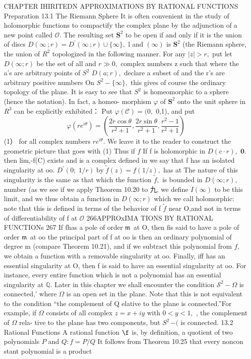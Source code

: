 CHAPTER IHIRITEDN APPROXIMATIONS BY RATIONAL FUNCTIONS Preparation 13.1 The Riemann Sphere It is often convenient in the study of holomorphic functions to compactify the complex plane by the adjunction of a new point called ${\mathcal{O}}.$ The resulting set ${\boldsymbol{S}}^{2}$ to be open if and only if it is the union of discs $D(\infty\,;r)=D^{\prime}(\infty\,;r)\cup\{\infty\},$ l and $\scriptstyle(\infty)$ is ${\boldsymbol{S}}^{2}$ (the Riemann sphere, the union of $R^{2}$ topologized in the following manner. For any $|z|>r,$ put let $D(\infty;r)$ be the set of all and $\scriptstyle r\gg0,$ complex numbers z such that where the a's are arbitrary points of $S^{2}$ $D(a;r),$ declare a subset of and the r's are arbitrary positive numbers On $S^{2}-\{\infty\},$ this gives of course the ordinary topology of the plane. It is easy to see that $S^{2}$ is homeomorphic to a sphere (hence the notation). In fact, a homeo- morphism $\varphi$ of ${\boldsymbol{S}}^{2}$ onto the unit sphere in $R^{3}$ can be explicitly exhibited： Put $\varphi(\mathcal{C})=(0,$ 0,1), and put $$ \varphi(r e^{i\theta})=\left(\frac{2r\;\mathrm{cos}\;\theta}{r^{2}+1},\frac{2r\;\mathrm{sin}\;\theta}{r^{2}+1},\frac{r^{2}-1}{r^{2}+1}\right) $$ (1） for all complex numbers $r e^{i\theta}.$ We leave it to the reader to construct the geometric picture that goes with (1) Thus if $\boldsymbol{\mathit{f}}$ If f is holomorphic in $D(c\cdot r),$ ${\boldsymbol{0}}.$ then lim,-f(C) exists and is a complex defined in we say that f has an isolated singularity at oo. $D^{\prime}(0;\;1/r)\;\mathrm{by}\;{\tilde{f}}(z)=f(1/z),$ has at The nature of this singularity is the same as that which the function ${\tilde{f}},$ is bounded in $D(\infty;r),$ number (as we see if we apply Theorem 10.20 to 九, we define $\scriptstyle I(\infty)$ to be this limit, and we thus obtain a function in $D(\infty;r)$ which we call holomorphic: note that this is defined in terms of the behavior of f $\tilde{f}$ near O,and not in terms of differentiability of f at ${\mathcal{O}}$ 266APPROxIMA TIONS BY RATIONAL FUNCTIONs 267 If fhas a pole of order ${\mathfrak{m}}\,$ at O, then fis said to have a pole of order ${\mathfrak{m}}\,$ at oo the principal part of f at oo is then an ordinary polynomial of degree m (compare Theorem 10.21), and if we subtract this polynomial from $f,$ we obtain a function with a removable singularity at oo. Finally, iff has an essential singularity at O, then f is said to have an essential singularity at oo. For instance, every entire function which is not a polynomial has an essential singularity at $\mathbb{Q}.$ Later in this chapter we shall encounter the condition ${\mathcal{S}}^{2}-\Omega$ is connected,' where $\Omega$ is an open set in the plane. Note that this is not equivalent to the condition “the complement of Q elative to the plane is connected.”For example, if $\Omega$ consists of all complex $z=x+i y$ with $0<y<1,$ , the complement of $\Omega$ rela- tive to the plane has two components, but $\scriptstyle S^{2}\,{\mathrm{-(}}$ is connected. 13.2 Rational Functions A rational function $\boldsymbol{\f}$ is, by definition, a quotient of two polynomials ${\mathbf{}}P$ and $Q:f=P/Q$ It follows from Theorem 10.25 that every noncon stant polynomial is a product 